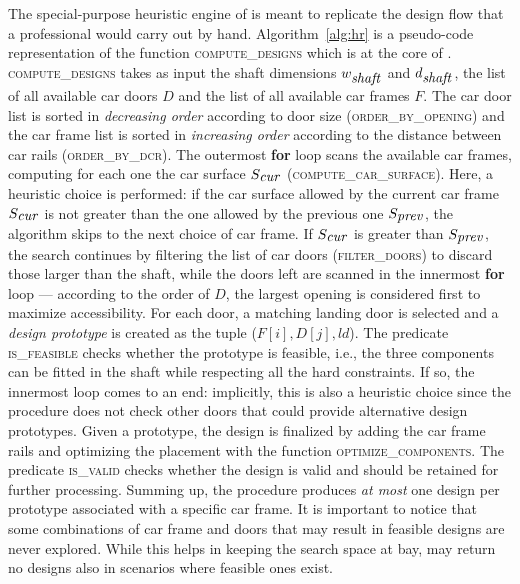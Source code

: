 The special-purpose heuristic engine of \liftcreatehr{} is meant to
replicate the design flow that a professional would carry out by hand.
Algorithm~\ref{alg:hr} is a pseudo-code representation of the function
\textsc{compute\_designs} which is at the core of
\liftcreatehr{}. \textsc{compute\_designs} takes as input the shaft 
dimensions $w_{\mbox{\emph{shaft}}}$ and $d_{\mbox{\emph{shaft}}}$,
the list of all available car
doors $D$ and the list of all available car frames $F$. The car door
list is sorted in \emph{decreasing order} according to door size 
(\textsc{order\_by\_opening}) and the car frame list is sorted in
\emph{increasing order} according to the distance between car rails
(\textsc{order\_by\_dcr}). 
The outermost \textbf{for} loop scans the available car frames,
computing for each one the car surface $S_{\mbox{\emph{cur}}}$
(\textsc{compute\_car\_surface}). Here, a heuristic choice is 
performed: if the car surface allowed by the current car frame
$S_{\mbox{\emph{cur}}}$ is not greater than the one allowed by the 
previous one $S_{\mbox{\emph{prev}}}$, the algorithm skips to the next 
choice of car frame. If $S_{\mbox{\emph{cur}}}$ is greater than 
$S_{\mbox{\emph{prev}}}$, the search continues by
filtering the list of car doors (\textsc{filter\_doors}) to discard
those larger than the shaft, while the doors left are scanned in the
innermost \textbf{for} loop --- according to the order of $D$, the
largest opening is considered first to maximize accessibility. For
each door, a matching landing door is selected and 
a \emph{design prototype} is created as the tuple ($F[i], D[j], 
ld$). The predicate \textsc{is\_feasible} checks whether the prototype
is feasible, i.e., the three components can be fitted in the shaft
while respecting all the hard constraints. If so, the innermost loop
comes to an end: implicitly, this is also a heuristic choice since the
procedure does not check other doors that could provide alternative
design prototypes. Given a prototype, the design is finalized by
adding the car frame rails and optimizing the placement with the
function \textsc{optimize\_components}. The predicate
\textsc{is\_valid} checks whether the design is valid and should
be retained for further processing.
Summing up, the procedure produces \textit{at most} one design per
prototype associated with a specific car frame. It is important
to notice that some combinations of car frame and doors that may
result in feasible designs are never explored. While this helps in
keeping the search space at bay, \liftcreatehr{} may return no
designs also in scenarios where feasible ones exist.

